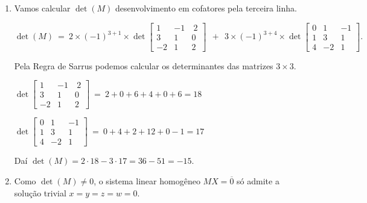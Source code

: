 \begin{solution}
\begin{enumerate}
\item[(a)] Vamos calcular $\det(M)$ desenvolvimento em cofatores pela terceira linha.

$$\det(M)\ =\ 
2 \times (-1)^{3+1} \times \det \left[ \begin{array}{rrr}
 1 & -1 & \  2 \\
 3 &  1 &  0 \\  
-2 &  1 &  2
\end{array} \right]\  \ + \ \ 
3 \times (-1)^{3+4} \times \det \left[ \begin{array}{rrr}
 0 &  1 & -1 \\
 1 &  3 &  1 \\  
 4 & -2 &  1
\end{array} \right] .$$

Pela Regra de Sarrus podemos calcular os determinantes das matrizes $3 \times 3$.

\hspace{3cm}$\det \left[ \begin{array}{rrr}
 1 & -1 & \  2 \\
 3 &  1 &  0 \\  
-2 &  1 &  2
\end{array} \right]\ =\ 2 + 0 + 6 + 4 + 0 + 6 = 18$

\bigskip
\hspace{3cm}$\det \left[ \begin{array}{rrr}
 0 &  1 & -1 \\
 1 &  3 &  1 \\  
 4 & -2 &  1
\end{array} \right]\ =\ 0 + 4 + 2 + 12 + 0 - 1 = 17$

Daí $\det(M) = 2 \cdot 18 - 3 \cdot 17 = 36 - 51 = -15$.

\item[(b)] Como $\det(M) \neq 0$, o sistema linear homogêneo $MX=\overline{0}$ só admite a solução trivial $x=y=z=w=0$.

\end{enumerate}
\end{solution}

